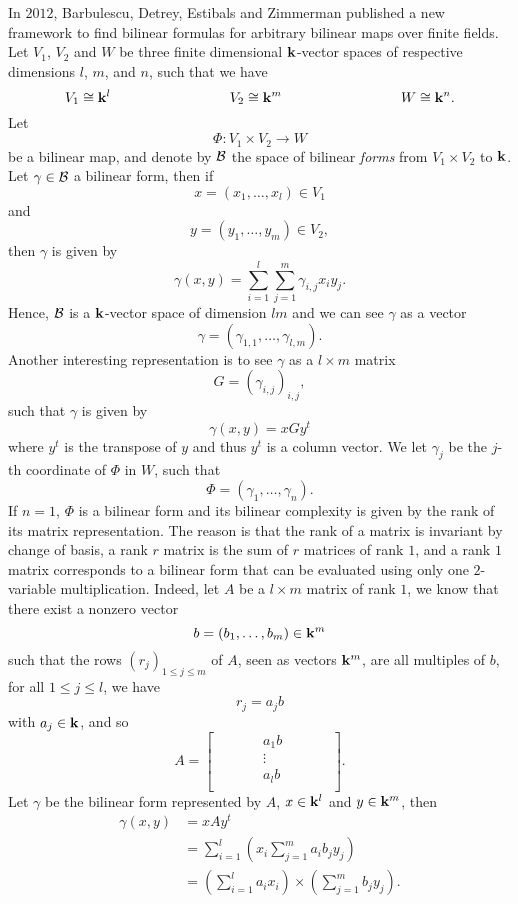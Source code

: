 In $2012$, Barbulescu, Detrey, Estibals and Zimmerman published a new framework
to find bilinear formulas for arbitrary bilinear maps over finite fields. Let
$V_1$, $V_2$ and $W$ be three finite dimensional $\mathbf{k}$-vector spaces of respective
dimensions $l$, $m$, and $n$, such that we have
\[
  V_1\cong\K^l\hspace{3cm}V_2\cong\K^m\hspace{3cm}W\cong\K^n.
\]
Let
\[
  \Phi:V_1\times V_2\to W
\]
be a bilinear map, and denote by $\mathcal{B}$ the space of bilinear \emph{forms} from
$V_1\times V_2$ to $\mathbf{k}$. Let $\gamma\in\mathcal{B}$ a bilinear form, then if
\[
  x = (x_1, \dots, x_l)\in V_1
\]
and
\[
  y = (y_1, \dots, y_m)\in V_2,
\]
then $\gamma$ is given by
\[
  \gamma(x, y) = \sum_{i=1}^{l}\sum_{j=1}^m \gamma_{i, j} x_i y_j.
\]
Hence, $\mathcal{B}$ is a $\mathbf{k}$-vector space of dimension $lm$ and we can see $\gamma$ as
a vector
\[
  \gamma = (\gamma_{1, 1}, \dots, \gamma_{l, m}).
\]
Another interesting representation is to see $\gamma$ as a $l\times m$ matrix
\[
  G = (\gamma_{i, j})_{i, j},
\]
such that $\gamma$ is given by
\[
  \gamma(x, y) = x G y^t
\]
where $y^t$ is the transpose of $y$ and thus $y^t$ is a column vector. We let
$\gamma_j$ be the $j$-th coordinate of $\Phi$ in $W$, such that
\[
  \Phi = (\gamma_1, \dots, \gamma_n).
\]
If $n=1$, $\Phi$ is a bilinear form and its bilinear complexity is given by the
rank of its matrix representation. The reason is that the rank of a matrix is
invariant by change of basis, a rank $r$ matrix is the sum of $r$ matrices of rank $1$,
and a rank $1$ matrix corresponds to a bilinear form that can be evaluated using
only one $2$-variable multiplication. Indeed, let $A$ be a $l\times m$ matrix of rank $1$, we know that
there exist a nonzero vector 
\[
  b=(b_1, \dots, b_m)\in\mathbf{k}^m
\]
such that the rows $(r_j)_{1\leq j \leq m}$ of $A$, seen as vectors $\mathbf{k}^m$, are
all multiples of $b$, \ie for all $1\leq j \leq l$, we have
\[
  r_j = a_j b
\]
with $a_j\in\mathbf{k}$, and so
\[
  A =
\begin{bmatrix}
  & & & & a_1 b & & & & \\
  & & & & \vdots & & & & \\
  & & & & a_l b & & & & \\
\end{bmatrix}.
\]
Let $\gamma$ be the bilinear form represented by $A$, $x\in\mathbf{k}^l$ and $y\in\mathbf{k}^m$, then
\begin{align*}
  \gamma(x, y) &= x A y^t \\
  &= \sum_{i=1}^{l}(x_i \sum_{j=1}^m a_i b_j y_j) \\
  &= (\sum_{i=1}^l a_i x_i)\times(\sum_{j=1}^m b_j y_j).
\end{align*}

